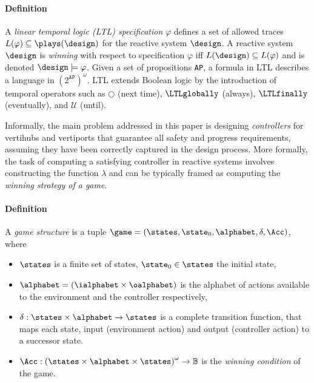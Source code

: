 \paragraph*{\textbf{Definition}}
%
A \emph{linear temporal logic (LTL) specification} $\varphi$ defines a set of allowed traces $L(\varphi) \subseteq \plays(\design)$ for the reactive system $\design$.  A reactive system $\design$ is \emph{winning} with respect to specification $\varphi$ iff $L(\design) \subseteq L(\varphi)$ and is denoted $\design \models \varphi$. Given a set of propositions \texttt{AP}, a formula in LTL describes a language in $(2^{\texttt{AP}})^\omega$. LTL extends Boolean logic by the introduction of temporal operators such as $\bigcirc$ (next time), $\LTLglobally$ (always), $\LTLfinally$ (eventually), and $\mathcal{U}$ (until). 


 Informally, the main problem addressed in this paper is designing \emph{controllers} for vertihubs and vertiports that guarantee all safety and progress requirements, assuming they have been correctly captured in the design process. More formally, the task of computing a satisfying controller in reactive systems involves constructing the function $\lambda$ and can be typically framed as computing the \emph{winning strategy of a game}. 



\paragraph*{\textbf{Definition}}
%
A \emph{game structure} is a tuple 
$\game = (\states, \state_0, \alphabet, \delta,\Acc)$,
where 
\begin{itemize}
\item $\states$ is a finite set of states, $\state_0 \in \states$ the initial state,
\item $\alphabet = (\ialphabet \times \oalphabet)$ is the alphabet of actions available to the environment and the controller respectively, 
\item $\delta: \states \times \alphabet \rightarrow \states$
is a complete transition function, that maps each state, input (environment action) and output (controller action) to a successor state.
\item $\Acc: \left(\states \times \alphabet \times \states\right)^\omega \rightarrow \mathbb{B}$ is the \emph{winning condition} of the game. 
\end{itemize}



